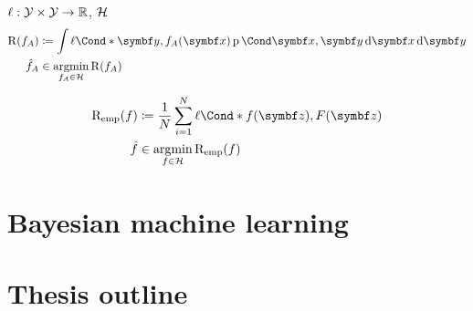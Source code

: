 \begin{definition}
    \label{def:risk_minimization}
    $\ell: \mathcal{Y} \times \mathcal{Y} \to \mathbb{R}$, $\mathcal{H}$
    \begin{align}
        \begin{split}
            \risk(f_A) &\coloneqq \int \Fun*{\ell}{\mat{y}, f_A(\mat{x})} \Prob{\mat{x}, \mat{y}} \diff \mat{x} \diff \mat{y} \\
            \hat{f}_A &\in \argmin_{f_A \in \Hc} \risk(f_A)
        \end{split}
    \end{align}
\end{definition}

\begin{definition}
    \label{def:empirical_risk_minimization}
    \begin{align}
        \begin{split}
            \emprisk(f) &\coloneqq \frac{1}{N} \sum_{i=1}^N \Fun*{\ell}{f(\mat{z}), F(\mat{z})} \\
            \hat{f} &\in \argmin_{f \in \Hc} \emprisk(f)
        \end{split}
    \end{align}
\end{definition}

\section{Bayesian machine learning}

\section{Thesis outline}
